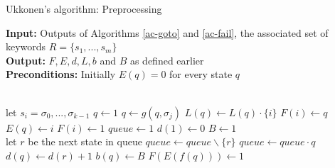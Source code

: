 \documentclass[english,twoside,censored,csm,algorithms-track-2020]{HYthesisML}
\theoremstyle{plain}
\theoremstyle{definition}
\numberwithin{testexample}{chapter}
\begin{document}
  \begin{algorithm}[!ht]

    \caption{Ukkonen's algorithm: Preprocessing} \label{ukk-pre}
    \hspace*{\algorithmicindent} \textbf{Input:} Outputs of Algorithms \ref{ac-goto} and \ref{ac-fail}, the associated set of keywords $R=\{s_1,...,s_m\}$ \\
    \hspace*{\algorithmicindent} \textbf{Output:} $F, E, d, L, b$ and $B$ as defined earlier\\
    \hspace*{\algorithmicindent} \textbf{Preconditions:} Initially $E(q) = 0$ for every state $q$
    
    \begin{algorithmic}[1]
         \\
          \hspace*{1.1cm plus \algorithmicindent} let $s_i = \sigma_0,...,\sigma_{k-1}$
          \State $q\gets 1$
            \State $q\gets g(q,\sigma_j)$
            \State $L(q)\gets L(q) \cdot \{i\}$ \footnotemark[1]
              \State $F(i)\gets q$
              \State $E(q)\gets i$
                \State $F(i)\gets 1$
              \EndIf
            \EndIf
          \EndFor
        \EndFor
        \State $queue\gets 1$
        \State $d(1)\gets 0$
        \State $B\gets 1$
        \\
          \hspace*{1.1cm plus \algorithmicindent} let $r$ be the next state in queue
          \State $queue\gets queue \backslash \{r\}$
           \footnotemark[2]
            \State $queue\gets queue\cdot q$
            \State $d(q)\gets d(r)+1$
            \State $b(q)\gets B$
            \State $F(E(f(q)))\gets 1$
          \EndFor
        \EndWhile
      \EndFunction
        
    \end{algorithmic}
  \end{algorithm}


\end{document}
